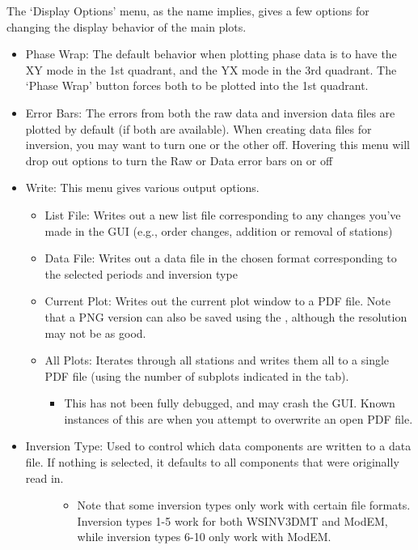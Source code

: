 \documentclass[letterpaper,10pt,english]{sphinxmanual}
\begin{document}
The ‘Display Options’ menu, as the name implies, gives a few options for changing the display behavior of the main plots.
\begin{itemize}
\item {} 
Phase Wrap: The default behavior when plotting phase data is to have the XY mode in the 1st quadrant, and the YX mode in the 3rd quadrant. The ‘Phase Wrap’ button forces both to be plotted into the 1st quadrant.

\item {} 
Error Bars: The errors from both the raw data and inversion data files are plotted by default (if both are available). When creating data files for inversion, you may want to turn one or the other off. Hovering this menu will drop out options to turn the Raw or Data error bars on or off

\item {} 
Write: This menu gives various output options.
\begin{itemize}
\item {} 
List File: Writes out a new list file corresponding to any changes you’ve made in the GUI (e.g., order changes, addition or removal of stations)

\item {} 
Data File: Writes out a data file in the chosen format corresponding to the selected periods and inversion type

\item {} 
Current Plot: Writes out the current plot window to a PDF file. Note that a PNG version can also be saved using the {\hyperref[\detokenize{content/data_plot/main_window:toolbar}]{}}, although the resolution may not be as good.

\item {} 
All Plots: Iterates through all stations and writes them all to a single PDF file (using the number of subplots indicated in the {\hyperref[\detokenize{content/data_plot/main_window:plot-options}]{}} tab).
\begin{itemize}
\item {} 
This has not been fully debugged, and may crash the GUI. Known instances of this are when you attempt to overwrite an open PDF file.

\end{itemize}

\end{itemize}

\item {} \begin{description}
\item[{Inversion Type: Used to control which data components are written to a data file. If nothing is selected, it defaults to all components that were originally read in.}] \leavevmode\begin{itemize}
\item {} 
Note that some inversion types only work with certain file formats. Inversion types 1-5 work for both WSINV3DMT and ModEM, while inversion types 6-10 only work with ModEM.


\end{itemize}
\end{description}
\end{itemize}
\end{document}
